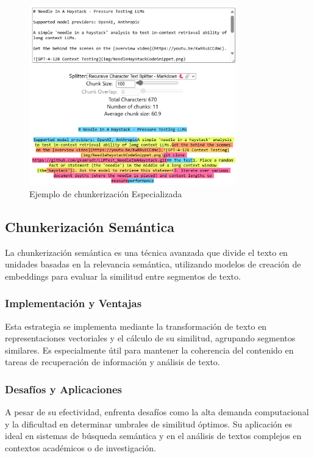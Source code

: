 \begin{figure}[!h]
\centering
\includegraphics[width=0.8\textwidth]{figuras/capitulo4/character_md_100.png}
\caption{Ejemplo de chunkerización Especializada}
\label{fig:imagen_chunk_md}
\end{figure}

\subsection{Chunkerización Semántica}

La chunkerización semántica es una técnica avanzada que divide el texto en unidades basadas en la relevancia semántica, utilizando modelos de creación de embeddings para evaluar la similitud entre segmentos de texto.

\subsubsection{Implementación y Ventajas}
Esta estrategia se implementa mediante la transformación de texto en representaciones vectoriales y el cálculo de su similitud, agrupando segmentos similares. Es especialmente útil para mantener la coherencia del contenido en tareas de recuperación de información y análisis de texto.

\subsubsection{Desafíos y Aplicaciones}
A pesar de su efectividad, enfrenta desafíos como la alta demanda computacional y la dificultad en determinar umbrales de similitud óptimos. Su aplicación es ideal en sistemas de búsqueda semántica y en el análisis de textos complejos en contextos académicos o de investigación.

